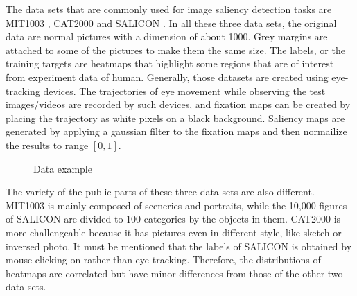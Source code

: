 \documentclass[12pt]{article}
\begin{document}
The data sets that are commonly used for image saliency detection tasks are MIT1003 \cite{judd2012benchmark}, CAT2000 \cite{borji2015cat2000} and SALICON \cite{jiang2015salicon}.
In all these three data sets, the original data are normal pictures with a dimension of about 1000. Grey margins are attached to some of the pictures to make them the same size. 
The labels, or the training targets are heatmaps that highlight some regions that are of interest from experiment data of human.
Generally, those datasets are created using eye-tracking devices. The trajectories of eye movement while
observing the test images/videos are recorded by such devices, and fixation maps can be created
by placing the trajectory as white pixels on a black background. Saliency maps are generated by
applying a gaussian filter to the fixation maps and then normailize the results to range $[0, 1]$.
\begin{figure}
    \centering
    \hspace{5mm}
    \caption{Data example}
    \label{img:data_example}
\end{figure}

The variety of the public parts of these three data sets are also different. MIT1003 is mainly composed of sceneries and portraits, while the 10,000 figures of SALICON are divided to 100 categories by the objects in them. CAT2000 is more challengeable because it has pictures even in different style, like sketch or inversed photo. 
It must be mentioned that the labels of SALICON is obtained by mouse clicking on rather than eye tracking. Therefore, the distributions of heatmaps are correlated but have minor differences from those of the other two data sets.
\end{document}
